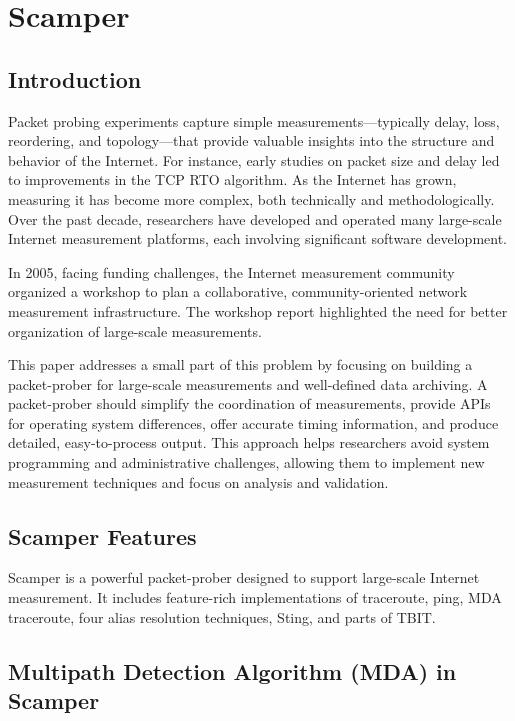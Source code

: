 \documentclass[12pt]{cwru_thesis}
\begin{document}
\section{Scamper}

\subsection{Introduction}

Packet probing experiments capture simple measurements—typically delay, loss, reordering, and topology—that provide valuable insights into the structure and behavior of the Internet. For instance, early studies on packet size and delay led to improvements in the TCP RTO algorithm. As the Internet has grown, measuring it has become more complex, both technically and methodologically. Over the past decade, researchers have developed and operated many large-scale Internet measurement platforms, each involving significant software development.

In 2005, facing funding challenges, the Internet measurement community organized a workshop to plan a collaborative, community-oriented network measurement infrastructure. The workshop report highlighted the need for better organization of large-scale measurements.

This paper addresses a small part of this problem by focusing on building a packet-prober for large-scale measurements and well-defined data archiving. A packet-prober should simplify the coordination of measurements, provide APIs for operating system differences, offer accurate timing information, and produce detailed, easy-to-process output. This approach helps researchers avoid system programming and administrative challenges, allowing them to implement new measurement techniques and focus on analysis and validation.


\subsection{Scamper Features}

Scamper is a powerful packet-prober designed to support large-scale Internet measurement. It includes feature-rich implementations of traceroute, ping, MDA traceroute, four alias resolution techniques, Sting, and parts of TBIT.

\subsection{Multipath Detection Algorithm (MDA) in Scamper}
\end{document}
